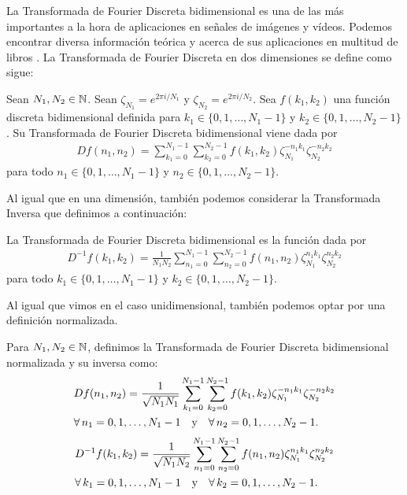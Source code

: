 \documentclass{article}
\begin{document}
La Transformada de Fourier Discreta bidimensional es una de las más importantes a la hora de aplicaciones en señales de imágenes y vídeos. Podemos encontrar diversa información teórica y acerca de sus aplicaciones en multitud de libros \cite{rao2011fast}. La Transformada de Fourier Discreta en dos dimensiones se define como sigue:
\begin{definition}
    Sean $N_1, N_2 \in \mathbb{N}$. Sean $ \zeta_{N_{1}} = e^{2\pi i / N_1}$ y $ \zeta_{N_{2}} = e^{2\pi i / N_2}$. Sea $f(k_1,k_2)$ una función discreta bidimensional definida para $k_1 \in \{ 0,1,\dots , N_1 - 1\}$ y $k_2 \in \{ 0,1,\dots , N_2 - 1\}$. Su Transformada de Fourier Discreta bidimensional viene dada por
    \begin{align*}
        Df(n_1, n_2) = \sum_{k_1=0}^{N_1 - 1}\sum_{k_2=0}^{N_2 - 1} f(k_1, k_2) \zeta_{N_{1}}^{-n_1k_1}  \zeta_{N_{2}}^{-n_2k_2} 
    \end{align*}
    para todo $n_1 \in \{ 0,1,\dots , N_1 - 1\}$ y $n_2 \in \{ 0,1,\dots , N_2 - 1\}$.
\end{definition}
Al igual que en una dimensión, también podemos considerar la Transformada Inversa que definimos a continuación:
\begin{definition}
    La Transformada de Fourier Discreta bidimensional es la función dada por
    \begin{align*}
        D^{-1}f(k_1, k_2) = \frac{1}{N_1N_2}\sum_{n_1=0}^{N_1-1} \sum_{n_2=0}^{N_2-1} f(n_1, n_2)  \zeta_{N_{1}}^{n_1k_1}  \zeta_{N_{2}}^{n_2k_2} 
    \end{align*}
    para todo $k_1 \in \{ 0,1,\dots , N_1 - 1\}$ y $k_2 \in \{ 0,1,\dots , N_2 - 1\}$.
\end{definition}
Al igual que vimos en el caso unidimensional, también podemos optar por una definición normalizada.
\begin{definition}
    Para $N_1,N_2 \in \mathbb{N}$, definimos la Transformada de Fourier Discreta bidimensional normalizada y su inversa como:
    \begin{align*}
        & Df(n_1, n_2) = \frac{1}{\sqrt{N_1N_1}} \sum_{k_1=0}^{N_1 - 1}\sum_{k_2=0}^{N_2 - 1} f(k_1, k_2) \zeta_{N_{1}}^{-n_1k_1}  \zeta_{N_{2}}^{-n_2k_2} \\
        & \forall \, n_1 = 0,1,\dots , N_1 - 1 \quad \hbox{y} \quad \forall \, n_2 = 0,1,\dots , N_2 - 1.
    \end{align*}
    \begin{align*}
        & D^{-1}f(k_1, k_2) = \frac{1}{\sqrt{N_1N_2}}\sum_{n_1=0}^{N_1-1} \sum_{n_2=0}^{N_2-1} f(n_1, n_2)  \zeta_{N_{1}}^{n_1k_1}  \zeta_{N_{2}}^{n_2k_2} \\
        & \forall \, k_1 = 0,1,\dots , N_1 - 1 \quad \hbox{y} \quad \forall \, k_2 = 0,1,\dots , N_2 - 1.
    \end{align*}
\end{definition}
\end{document}
